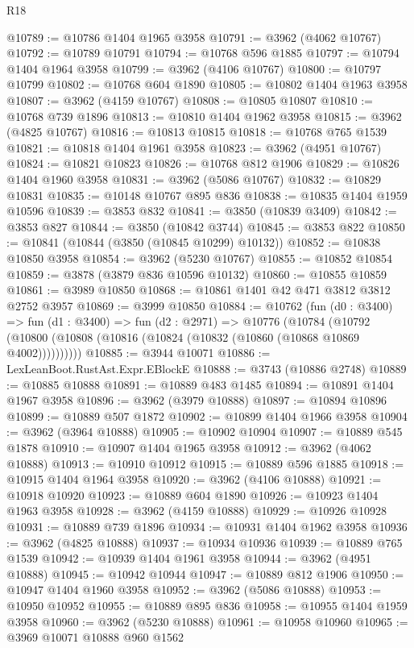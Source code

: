 \begin{lexlean}{R18}
\begin{coremodule}
@10789 := @10786 @1404 @1965 @3958
@10791 := @3962 (@4062 @10767)
@10792 := @10789 @10791
@10794 := @10768 @596 @1885
@10797 := @10794 @1404 @1964 @3958
@10799 := @3962 (@4106 @10767)
@10800 := @10797 @10799
@10802 := @10768 @604 @1890
@10805 := @10802 @1404 @1963 @3958
@10807 := @3962 (@4159 @10767)
@10808 := @10805 @10807
@10810 := @10768 @739 @1896
@10813 := @10810 @1404 @1962 @3958
@10815 := @3962 (@4825 @10767)
@10816 := @10813 @10815
@10818 := @10768 @765 @1539
@10821 := @10818 @1404 @1961 @3958
@10823 := @3962 (@4951 @10767)
@10824 := @10821 @10823
@10826 := @10768 @812 @1906
@10829 := @10826 @1404 @1960 @3958
@10831 := @3962 (@5086 @10767)
@10832 := @10829 @10831
@10835 := @10148 @10767 @895 @836
@10838 := @10835 @1404 @1959 @10596
@10839 := @3853 @832
@10841 := @3850 (@10839 @3409)
@10842 := @3853 @827
@10844 := @3850 (@10842 @3744)
@10845 := @3853 @822
@10850 := @10841 (@10844 (@3850 (@10845 @10299) @10132))
@10852 := @10838 @10850 @3958
@10854 := @3962 (@5230 @10767)
@10855 := @10852 @10854
@10859 := @3878 (@3879 @836 @10596 @10132)
@10860 := @10855 @10859
@10861 := @3989 @10850
@10868 := @10861 @1401 @42 @471 @3812 @3812 @2752 @3957
@10869 := @3999 @10850
@10884 := @10762
    (fun (d0 : @3400) =>
    fun (d1 : @3400) =>
    fun (d2 : @2971) =>
    @10776
      (@10784 (@10792 (@10800 (@10808 (@10816 (@10824 (@10832 (@10860 (@10868 @10869 @4002))))))))))
@10885 := @3944 @10071
@10886 := LexLeanBoot.RustAst.Expr.EBlockE
@10888 := @3743 (@10886 @2748)
@10889 := @10885 @10888
@10891 := @10889 @483 @1485
@10894 := @10891 @1404 @1967 @3958
@10896 := @3962 (@3979 @10888)
@10897 := @10894 @10896
@10899 := @10889 @507 @1872
@10902 := @10899 @1404 @1966 @3958
@10904 := @3962 (@3964 @10888)
@10905 := @10902 @10904
@10907 := @10889 @545 @1878
@10910 := @10907 @1404 @1965 @3958
@10912 := @3962 (@4062 @10888)
@10913 := @10910 @10912
@10915 := @10889 @596 @1885
@10918 := @10915 @1404 @1964 @3958
@10920 := @3962 (@4106 @10888)
@10921 := @10918 @10920
@10923 := @10889 @604 @1890
@10926 := @10923 @1404 @1963 @3958
@10928 := @3962 (@4159 @10888)
@10929 := @10926 @10928
@10931 := @10889 @739 @1896
@10934 := @10931 @1404 @1962 @3958
@10936 := @3962 (@4825 @10888)
@10937 := @10934 @10936
@10939 := @10889 @765 @1539
@10942 := @10939 @1404 @1961 @3958
@10944 := @3962 (@4951 @10888)
@10945 := @10942 @10944
@10947 := @10889 @812 @1906
@10950 := @10947 @1404 @1960 @3958
@10952 := @3962 (@5086 @10888)
@10953 := @10950 @10952
@10955 := @10889 @895 @836
@10958 := @10955 @1404 @1959 @3958
@10960 := @3962 (@5230 @10888)
@10961 := @10958 @10960
@10965 := @3969 @10071 @10888 @960 @1562

\end{coremodule}
\end{lexlean}
